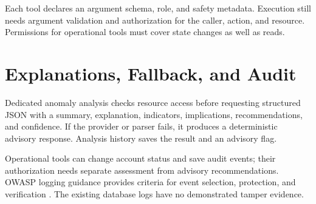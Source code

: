 Each tool declares an argument schema, role, and safety metadata. Execution still needs argument validation and authorization for the caller, action, and resource. Permissions for operational tools must cover state changes as well as reads.

\section{Explanations, Fallback, and Audit}
Dedicated anomaly analysis checks resource access before requesting structured JSON with a summary, explanation, indicators, implications, recommendations, and confidence. If the provider or parser fails, it produces a deterministic advisory response. Analysis history saves the result and an advisory flag.

Operational tools can change account status and save audit events; their authorization needs separate assessment from advisory recommendations. OWASP logging guidance provides criteria for event selection, protection, and verification \cite{owasp}. The existing database logs have no demonstrated tamper evidence.
